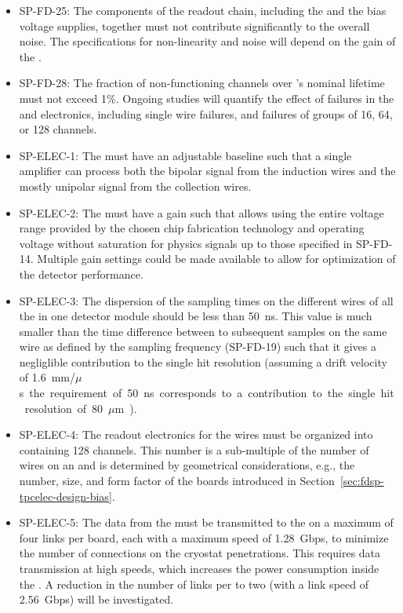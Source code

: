 \begin{itemize}
\item SP-FD-25: 
The components of the readout chain, including the 
and the bias voltage supplies, together must not contribute significantly to
the overall noise. The  specifications for non-linearity and 
noise will depend on the gain of the .

\item SP-FD-28: The fraction of non-functioning channels over 
's nominal \dunelifetime lifetime must not exceed 1\%. 
Ongoing studies will quantify the effect of failures
in the  and electronics, including
single wire failures, and failures of groups of
\num{16}, \num{64}, or \num{128} channels.

\item SP-ELEC-1: The  must have an adjustable baseline such that a single
amplifier can process both the bipolar signal from the induction wires and the mostly 
unipolar signal from the collection wires. 

\item SP-ELEC-2: The  must have a gain such that allows using the entire
voltage range provided by the chosen chip fabrication technology and operating
voltage without saturation for physics signals up to those specified in
SP-FD-14. Multiple gain settings could be made available to allow for optimization
of the detector performance.

\item SP-ELEC-3: The dispersion of the sampling times on the different wires of
all the  in one   detector module should
be less than \SI{50}{ns}. This value is much smaller than the 
time difference between to subsequent samples on the same wire
as defined by the sampling frequency (SP-FD-19) such that it gives
a negliglible contribution to the single hit resolution (assuming
a drift velocity of \SI{1.6}{mm/$\mu$s} the requirement of \SI{50}{ns}
corresponds to a contribution to the single hit resolution of \SI{80}{$\mu$m}).

\item SP-ELEC-4: The readout electronics for the  wires must be organized
into  containing 128 channels. This number is a sub-multiple
of the number of wires on an  and is determined
by geometrical considerations, e.g., the number, size, and form
factor of the  boards introduced in Section~\ref{sec:fdsp-tpcelec-design-bias}.

\item SP-ELEC-5: The data from the  must be transmitted to the
 on a maximum of four links per board, each with a maximum
speed of \SI{1.28}{Gbps}, to minimize
the number of connections on the cryostat penetrations. This 
requires data transmission at high speeds, which 
increases the power consumption inside the .
A reduction in the number of links per  to two
(with a link speed of \SI{2.56}{Gbps}) will be investigated.


\end{itemize}
